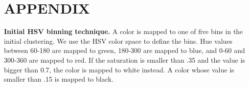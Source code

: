 \appendix
\section{APPENDIX}
{\bf Initial HSV binning technique.} A color is mapped to one of five
bins in the initial clustering. We use the HSV color space to define
the bins. Hue values between 60-180 are mapped to green, 180-300 are mapped to
blue, and 0-60 and 300-360 are mapped to red. If the saturation is
smaller than .35 and the value is bigger than 0.7, the color is mapped to
white instead. A color whose value is smaller than .15 is mapped to black.\\

